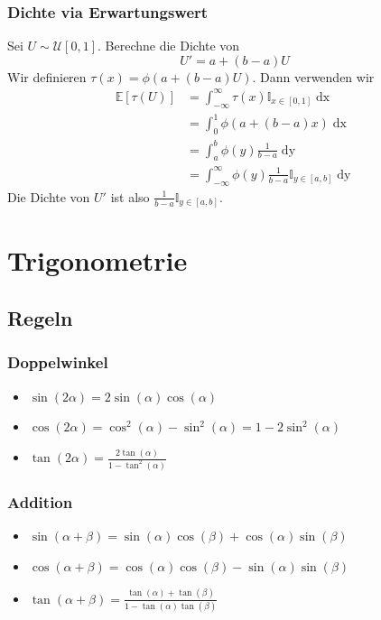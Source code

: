 \documentclass[a4paper,10pt]{article}
\def\E{\mathbb{E}}
\begin{document}
\subsubsection*{Dichte via Erwartungswert}
Sei \(U \sim \mathcal{U}[0,1]\). Berechne die Dichte von
\[U' = a + (b-a)U\]
Wir definieren \(\tau(x) = \phi(a +(b-a)U)\). Dann verwenden wir
\begin{align*}
	\E[\tau(U)] & = \int_{-\infty}^\infty \tau(x) \mathbb{I}_{x\in [0,1]}\mathop{dx}              \\
	            & = \int_0^1 \phi(a + (b-a)x) \mathop{dx}                                         \\
	            & = \int_a^b \phi(y)\frac{1}{b-a} \mathop{dy}                                     \\
	            & = \int_{-\infty}^\infty \phi(y)\frac{1}{b-a} \mathbb{I}_{y\in[a,b]} \mathop{dy}
\end{align*}
Die Dichte von \(U'\) ist also \(\frac{1}{b-a} \mathbb{I}_{y\in[a,b]}\).

\section{Trigonometrie}

\subsection{Regeln}

\subsubsection{Doppelwinkel}
\begin{itemize}
	\item $\sin(2\alpha) = 2 \sin(\alpha) \cos(\alpha)$
	\item $\cos(2\alpha) = \cos^2(\alpha) - \sin^2(\alpha) = 1 - 2 \sin^2(\alpha)$
	\item $\tan(2\alpha) = \frac{2\tan(\alpha)}{1 - \tan^2(\alpha)}$
\end{itemize}

\subsubsection{Addition}
\begin{itemize}
	\item $\sin(\alpha + \beta) = \sin(\alpha) \cos(\beta) + \cos(\alpha) \sin(\beta)$
	\item $\cos(\alpha + \beta) = \cos(\alpha) \cos(\beta) - \sin(\alpha) \sin(\beta)$
	\item $\tan(\alpha + \beta) = \frac{\tan(\alpha) + \tan(\beta)}{1 - \tan(\alpha) \tan(\beta)}$
\end{itemize}
\end{document}
